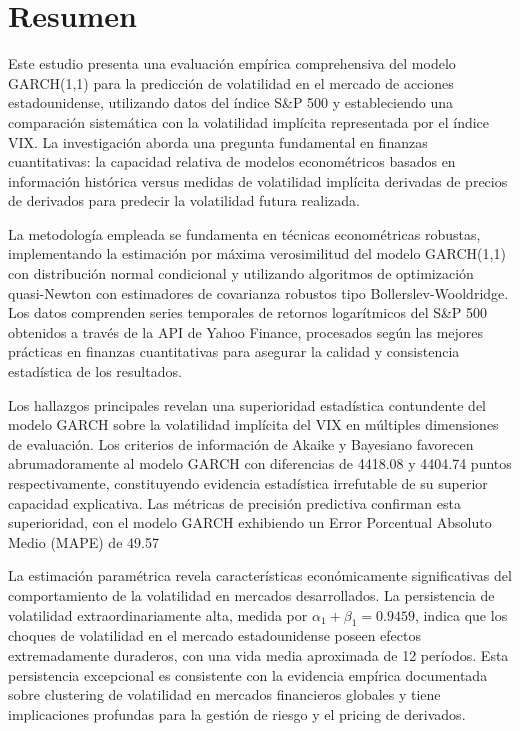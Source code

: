 \section{Resumen}

Este estudio presenta una evaluación empírica comprehensiva del modelo GARCH(1,1) para la predicción de volatilidad en el mercado de acciones estadounidense, utilizando datos del índice S\&P 500 y estableciendo una comparación sistemática con la volatilidad implícita representada por el índice VIX. La investigación aborda una pregunta fundamental en finanzas cuantitativas: la capacidad relativa de modelos econométricos basados en información histórica versus medidas de volatilidad implícita derivadas de precios de derivados para predecir la volatilidad futura realizada.

La metodología empleada se fundamenta en técnicas econométricas robustas, implementando la estimación por máxima verosimilitud del modelo GARCH(1,1) con distribución normal condicional y utilizando algoritmos de optimización quasi-Newton con estimadores de covarianza robustos tipo Bollerslev-Wooldridge. Los datos comprenden series temporales de retornos logarítmicos del S\&P 500 obtenidos a través de la API de Yahoo Finance, procesados según las mejores prácticas en finanzas cuantitativas para asegurar la calidad y consistencia estadística de los resultados.

Los hallazgos principales revelan una superioridad estadística contundente del modelo GARCH sobre la volatilidad implícita del VIX en múltiples dimensiones de evaluación. Los criterios de información de Akaike y Bayesiano favorecen abrumadoramente al modelo GARCH con diferencias de 4418.08 y 4404.74 puntos respectivamente, constituyendo evidencia estadística irrefutable de su superior capacidad explicativa. Las métricas de precisión predictiva confirman esta superioridad, con el modelo GARCH exhibiendo un Error Porcentual Absoluto Medio (MAPE) de 49.57%

La estimación paramétrica revela características económicamente significativas del comportamiento de la volatilidad en mercados desarrollados. La persistencia de volatilidad extraordinariamente alta, medida por $\alpha_1 + \beta_1 = 0.9459$, indica que los choques de volatilidad en el mercado estadounidense poseen efectos extremadamente duraderos, con una vida media aproximada de 12 períodos. Esta persistencia excepcional es consistente con la evidencia empírica documentada sobre clustering de volatilidad en mercados financieros globales y tiene implicaciones profundas para la gestión de riesgo y el pricing de derivados.

